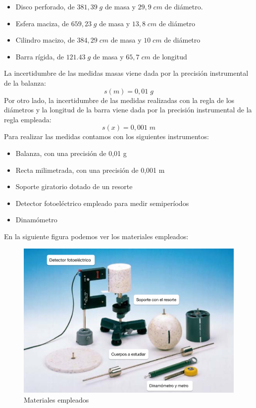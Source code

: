 \documentclass[a4paper,12pt,titlepage]{article}
\begin{document}
\begin{itemize}
    \item Disco perforado, de $381,39 \;g$ de masa y $29,9 \; cm$ de diámetro.
    \item Esfera maciza, de $659,23 \; g$ de masa y $13,8 \; cm$ de diámetro
    \item Cilindro macizo, de $384,29 \; cm $ de masa y $10 \; cm$ de diámetro
    \item Barra rígida, de $121.43 \;g$ de masa y $65,7 \; cm$ de longitud
\end{itemize}
La incertidumbre de las medidas masas viene dada por la precisión instrumental de la balanza:
\begin{equation}
    s(m) = 0,01 \; g
\end{equation}
Por otro lado, la incertidumbre de las medidas realizadas con la regla de los diámetros y la longitud de la barra viene dada por la precisión instrumental de la regla empleada:
\begin{equation}
    s(x) = 0,001 \;m
\end{equation}
Para realizar las medidas contamos con los siguientes instrumentos:

\begin{itemize}
    \item Balanza, con una precisión de 0,01 g
    \item Recta milimetrada, con una precisión de 0,001 m
    \item Soporte giratorio dotado de un resorte
    \item Detector fotoeléctrico empleado para medir semiperíodos
    \item Dinamómetro
\end{itemize}

En la siguiente figura podemos ver los materiales empleados:

\begin{figure}[h!]
    \centering
    \includegraphics[width=0.75\linewidth]{Images/Material MI-1.jpg}
    \caption{Materiales empleados}
\end{figure}
\end{document}
